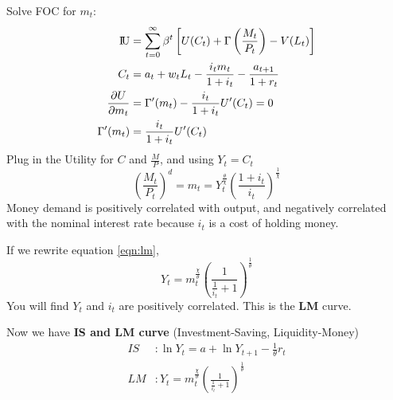 \documentclass[12pt]{article}
\begin{document}
Solve FOC for $ m_{t} $:
\begin{align*}
{\rm I\!{U}} &= \sum\limits_{t = 0} ^\infty \beta^{t}	\left[ 
		U(C_{t}) + \Gamma \left( \frac{M_{t}}{P_{t}} \right)  - V(L_{t})
\right] \\
C_{t}&= a_{t} + w_{t}L_{t} - \frac{i_{t}m_{t}}{1 + i_{t}} - \frac{a_{t + 1}}{1 + r_{t}}
\\
\frac{\partial U }{\partial m_{t} }&= \Gamma'(m_{t}) - \frac{i_{t}}{1 + i_{t}}U'(C_{t})
=0\\
\Gamma'(m_{t})&= \frac{i_{t}}{1 + i_{t}}U'(C_{t})
\end{align*}
Plug in the Utility for $ C $ and $ \frac{M}{P} $, and using $ Y_{t} = C_{t} $
\begin{equation}
		\label{eqn:lm}
\left( \frac{M_{t}}{P_{t}} \right)^{d}  = 
m_{t} = Y_{t}^{\frac{\theta}{\chi}}\left( \frac{1 + i_{t}}{i_{t}} \right)^{
\frac{1}{\chi}}
\end{equation}
Money demand is positively correlated with output, and negatively correlated with
the nominal interest rate because $ i_{t} $ is a cost of holding money.

If we rewrite equation \eqref{eqn:lm},
\begin{equation*}
Y_{t} = m_{t}^{\frac{\chi}{\theta}}\left( \frac{1}{\frac{1}{i_{t}} + 1} \right) 
^{\frac{1}{\theta}}
\end{equation*}
You will find $ Y_{t} $ and $ i_{t} $ are positively correlated. This is the 
{\textbf {LM}} curve.

Now we have {\textbf {IS and LM curve}} (Investment-Saving, Liquidity-Money)
\begin{align*}
IS&:
\ln Y_{t} = a + \ln Y_{t + 1} - \frac{1}{\theta}r_{t}\\
LM &:
Y_{t} = m_{t}^{\frac{\chi}{\theta}}\left( \frac{1}{\frac{1}{i_{t}} + 1} \right) 
^{\frac{1}{\theta}}
\end{align*}
\end{document}
